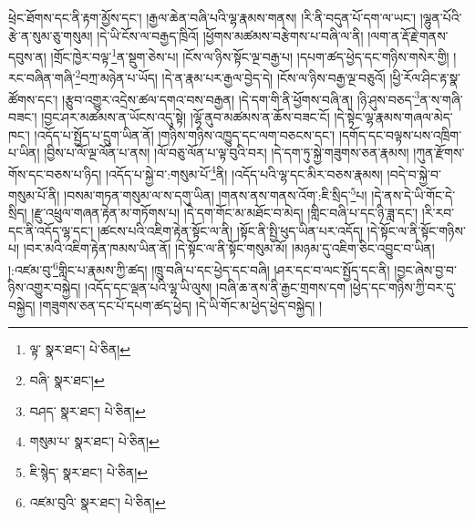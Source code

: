 ཕྲེང་ཐོགས་དང་ནི་རྟག་མྱོས་དང་། །རྒྱལ་ཆེན་བཞི་པའི་ལྷ་རྣམས་གནས། །རི་ནི་བདུན་པོ་དག་ལ་ཡང་། །ལྷུན་པོའི་རྩེ་ན་སུམ་ཅུ་གསུམ། །དེ་ཡི་ངོས་ལ་བརྒྱད་ཁྲིའོ། །ཕྱོགས་མཚམས་བརྩེགས་པ་བཞི་ལ་ནི། །ལག་ན་རྡོ་རྗེ་གནས་དབུས་ན། །གྲོང་ཁྱེར་བལྟ་\footnote{ལྟ་  སྣར་ཐང་།  པེ་ཅིན། }ན་སྡུག་ཅེས་པ། །ངོས་ལ་ཉིས་སྟོང་ལྔ་བརྒྱ་པ། །དཔག་ཚད་ཕྱེད་དང་གཉིས་གསེར་གྱི། །རང་བཞིན་གཞི་\footnote{བཞི་  སྣར་ཐང་། }བཀྲ་མཉེན་པ་ཡོད། །དེ་ན་རྣམ་པར་རྒྱལ་བྱེད་དེ། །ངོས་ལ་ཉིས་བརྒྱ་ལྔ་བཅུའོ། །ཕྱི་རོལ་ཤིང་རྟ་སྣ་ཚོགས་དང་། །རྩུབ་འགྱུར་འདྲེས་ཚལ་དགའ་བས་བརྒྱན། །དེ་དག་གི་ནི་ཕྱོགས་བཞི་ན། །ཉི་ཤུས་བཅད་\footnote{བཤད་  སྣར་ཐང་།  པེ་ཅིན། }ན་ས་གཞི་བཟང་། །བྱང་ཤར་མཚམས་ན་ཡོངས་འདུ་སྟེ། །ལྷོ་ནུབ་མཚམས་ན་ཆོས་བཟང་ངོ། །དེ་སྟེང་ལྷ་རྣམས་གཞལ་མེད་ཁང་། །འདོད་པ་སྤྱོད་པ་དྲུག་ཡིན་ནོ། །གཉིས་གཉིས་འཁྱུད་དང་ལག་བཅངས་དང་། །དགོད་དང་བལྟས་པས་འཁྲིག་པ་ཡིན། །བྱིས་པ་ལོ་ལྔ་ལོན་པ་ནས། །ལོ་བཅུ་ལོན་པ་ལྟ་བུའི་བར། །དེ་དག་ཏུ་སྐྱེ་གཟུགས་ཅན་རྣམས། །ཀུན་རྫོགས་གོས་དང་བཅས་པ་ཉིད། །འདོད་པ་སྐྱེ་བ་:གསུམ་པོ་\footnote{གསུམ་པ་  སྣར་ཐང་།  པེ་ཅིན། }ནི། །འདོད་པའི་ལྷ་དང་མིར་བཅས་རྣམས། །བདེ་བ་སྐྱེ་བ་གསུམ་པོ་ནི། །བསམ་གཏན་གསུམ་ལ་ས་དགུ་ཡིན། །གནས་ནས་གནས་འོག་:ཇི་སྲིད་\footnote{ཇི་སྙེད་  སྣར་ཐང་།  པེ་ཅིན། }པ། །དེ་ནས་དེ་ཡི་གོང་དེ་སྲིད། །རྫུ་འཕྲུལ་གཞན་རྟེན་མ་གཏོགས་པ། །དེ་དག་གོང་མ་མཐོང་བ་མེད། །གླིང་བཞི་པ་དང་ཉི་ཟླ་དང་། །རི་རབ་དང་ནི་འདོད་ལྷ་དང་། །ཚངས་པའི་འཇིག་རྟེན་སྟོང་ལ་ནི། །སྟོང་ནི་སྤྱི་ཕུད་ཡིན་པར་འདོད། །དེ་སྟོང་ལ་ནི་སྟོང་གཉིས་པ། །བར་མའི་འཇིག་རྟེན་ཁམས་ཡིན་ནོ། །དེ་སྟོང་ལ་ནི་སྟོང་གསུམ་མོ། །མཉམ་དུ་འཇིག་ཅིང་འབྱུང་བ་ཡིན། །:འཛམ་བུ་\footnote{འཛམ་བུའི་  སྣར་ཐང་།  པེ་ཅིན། }གླིང་པ་རྣམས་ཀྱི་ཚད། །ཁྲུ་བཞི་པ་དང་ཕྱེད་དང་བཞི། །ཤར་དང་བ་ལང་སྤྱོད་དང་ནི། །བྱང་ཞེས་བྱ་བ་ཉིས་འགྱུར་བསྐྱེད། །འདོད་དང་ལྡན་པའི་ལྷ་ཡི་ལུས། །བཞི་ཆ་ནས་ནི་རྒྱང་གྲགས་དག །ཕྱེད་དང་གཉིས་ཀྱི་བར་དུ་བསྐྱེད། །གཟུགས་ཅན་དང་པོ་དཔག་ཚད་ཕྱེད། །དེ་ཡི་གོང་མ་ཕྱེད་ཕྱེད་བསྐྱེད། །
